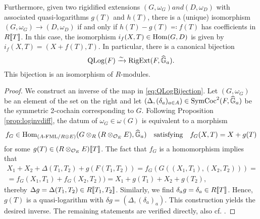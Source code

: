 \documentclass[../main.tex]{subfiles}
\begin{document}
\begin{thm}
Furthermore, given two rigidified extensions
$(G, \omega_G) and (D, \omega_{D})$ with associated quasi-logarithms
$g(T)$ and $h(T)$, there is a (unique) isomorphism $(G, \omega_G) \to (D, \omega_{D})$
if and only if $h(T)-g(T) \eqcolon  f(T)$ has coefficients in $R\llbracket T \rrbracket$. 
In this case, the isomorphism $i_f(X,T) \in \operatorname{Hom}(G, D)$ is
given by $i_f(X,T) = (X+f(T), T)$. In particular, there is a canonical bijection
\begin{equation*}
  \operatorname {QLog}(F) \xrightarrow{\sim} \operatorname {RigExt}(F, \widehat{\mathbb{G}}_a).
\end{equation*}
This bijection is an isomorphism of $R$-modules.
\begin{proof}[Proof]
  We construct an inverse of the map in \eqref{eq:QLogBijection}. Let $(G,
  \omega_G)$ be an element of the set on the right
  and let $(\Delta, (\delta_a)_{a \in A}) \in
  \operatorname{SymCoc}^2(F, \widehat{\mathbb{G}}_a)$ be the symmetric 2-cochain corresponding to $G$.
  Following Proposition \ref{prop:loginvdiff}, the datum of 
  $\omega_G \in \omega(G)$ is equivalent to a morphism 
  $$f_G \in \operatorname{Hom}_{{({A}\textnormal-\allowbreak\mathrm{FML}/{R \otimes E})}}(G \otimes_R (R \otimes_{\mathcal{O}_E} E), \widehat{\mathbb{G}}_a)
  \quad \text{satisfying} \quad f_G(X,T) = X + g(T)$$
  for some $g(T) \in (R \otimes_{\mathcal{O}_E} E)\llbracket T \rrbracket$. The fact that 
  $f_G$ is a homomorphism implies that 
  \begin{multline*}
    X_1 + X_2 + \Delta(T_1, T_2) + g(F(T_1,T_2)) = f_G(G((X_1, T_1), (X_2, T_2))) = \\
    = f_G(X_1, T_1) + f_G(X_2, T_2)) = X_1 + g(T_1) + X_2 + g(T_2),
  \end{multline*}
  thereby $\Delta g = \Delta(T_1, T_2) \in R\llbracket T_1, T_2\rrbracket$. Similarly, 
  we find $\delta_a g = \delta_a \in R\llbracket T \rrbracket$. Hence, $g(T)$ is a
  quasi-logarithm with $\delta g = (\Delta, (\delta_a)_a)$. 
  This construction yields the desired inverse.
  The remaining statements are verified directly, also cf. \cite[Section 8]{hopkins1994equivariant}.
\end{proof}
\end{thm}
\end{document}
